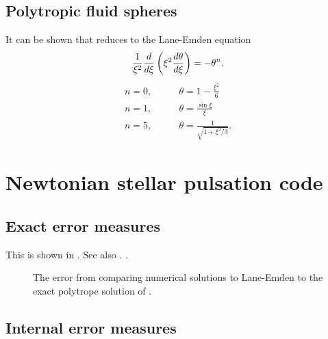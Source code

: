 \subsection{Polytropic fluid spheres}\label{subsec:chapter2:polytrope}
\lipsum[9][1-5]
It can be shown that  reduces to the Lane-Emden equation \citep{Lane1870}
\begin{equation}\label{eq:chapter2:laneemden}
	\frac{1}{\xi^2} \frac{d}{d\xi}\left( \xi^2 \frac{d\theta}{d\xi}\right) = -\theta^n.
\end{equation}
\lipsum[10][2-3]
\begin{subequations}\label{eq:chapter2:laneemdenExact}
\begin{align}
	n = 0, &\qquad \theta = 1 - \frac{\xi^2}{6}\\
	n = 1, &\qquad \theta = \frac{\sin \xi}{\xi}\\
	n = 5, &\qquad \theta = \frac{1}{\sqrt{1 + \xi^2/3}}.
\end{align}
\end{subequations}
\lipsum[10][4]


\section{Newtonian stellar pulsation code}\label{sec:chapter2:code}


\subsection{Exact error measures}\label{subsec:chapter2:code1}
\lipsum[1][3-8]
This is shown in .  See also .  \lipsum[2][11].

\begin{figure*}
	\resizebox{\linewidth}{!}{}
	\caption[Error in Lane-Emden polytrope code]{
	The error from comparing numerical solutions to Lane-Emden  to the exact polytrope solution of .
	\label{fig:chapter2:polyexact}}
\end{figure*}

\subsection{Internal error measures}\label{subsec:chapter2:code2}

